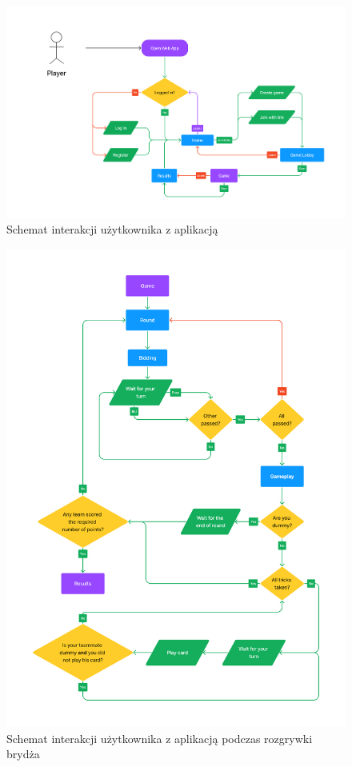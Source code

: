 \begin{figure}[h]
  \centering
  \includegraphics[width=\textwidth]{img/flow-aplikacji/user_flow.png}
  \caption{Schemat interakcji użytkownika z aplikacją}
\end{figure}

\begin{figure}[h]
  \centering
  \includegraphics[width=\textwidth]{img/flow-aplikacji/game_flow.png}
  \caption{Schemat interakcji użytkownika z aplikacją podczas rozgrywki brydża}
\end{figure}

